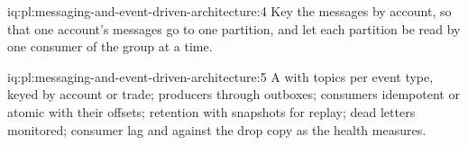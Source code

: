 \begin{solution}{iq:pl:messaging-and-event-driven-architecture:4}
Key the messages by account, so that one account's messages go to one partition, and let each partition be read by one consumer of the group
at a time.
\end{solution}

\begin{solution}{iq:pl:messaging-and-event-driven-architecture:5}
A  with topics per event type, keyed by account or trade; producers through outboxes; consumers idempotent or atomic with
their offsets; retention with snapshots for replay; dead letters monitored; consumer lag and  against the drop copy as the
health measures.
\end{solution}
